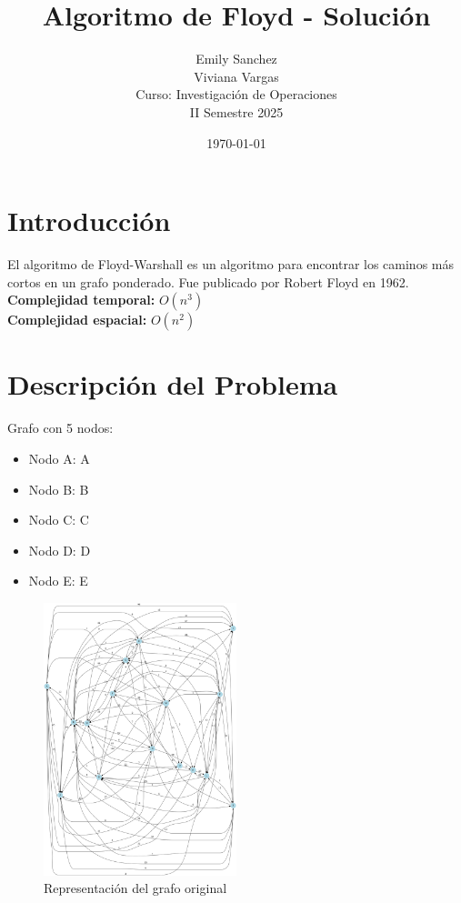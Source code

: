 \documentclass[12pt]{article}
\title{Algoritmo de Floyd - Solución}
\author{Emily Sanchez \\ Viviana Vargas \\[1cm] Curso: Investigación de Operaciones \\ II Semestre 2025}
\date{\today}
\begin{document}
\maketitle
\thispagestyle{empty}
\newpage
\setcounter{page}{1}

\section{Introducción}
El algoritmo de Floyd-Warshall es un algoritmo para encontrar los caminos más cortos en un grafo ponderado. Fue publicado por Robert Floyd en 1962.\\
\textbf{Complejidad temporal:} $O(n^3)$\\
\textbf{Complejidad espacial:} $O(n^2)$

\clearpage
\section{Descripción del Problema}
Grafo con 5 nodos:

\begin{itemize}
\item Nodo A: A
\item Nodo B: B
\item Nodo C: C
\item Nodo D: D
\item Nodo E: E
\end{itemize}

\begin{figure}[h!]
\centering
\includegraphics[width=0.5\textwidth,keepaspectratio]{grafo.png}
\caption{Representación del grafo original}
\end{figure}
\end{document}
